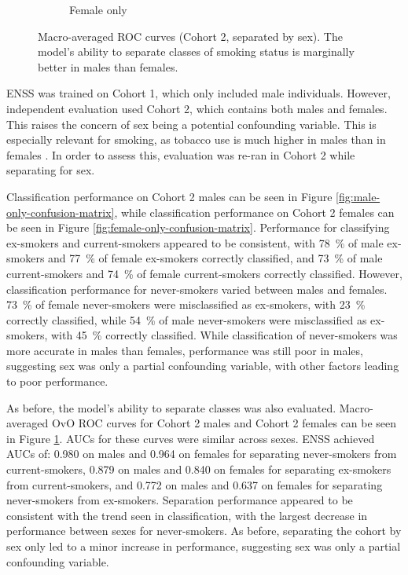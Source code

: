 \documentclass{article} %
\begin{document}
\begin{figure}[!p]
\begin{subfigure}{0.42\linewidth}
        \caption{Female only}
    \end{subfigure}
    \caption[Macro-averaged ROC curves (Cohort 2, separated by sex)]{Macro-averaged ROC curves (Cohort 2, separated by sex). The model's ability to separate classes of smoking status is marginally better in males than females.}
    \label{fig:sex-sep-macro-rocs}
\end{figure}

ENSS was trained on Cohort 1, which only included male individuals. However, independent evaluation used Cohort 2, which contains both males and females. This raises the concern of sex being a potential confounding variable. This is especially relevant for smoking, as tobacco use is much higher in males than in females \cite{WHO2021Tobacco, higgins2015literature}. In order to assess this, evaluation was re-ran in Cohort 2 while separating for sex.

Classification performance on Cohort 2 males can be seen in Figure \ref{fig:male-only-confusion-matrix}, while classification performance on Cohort 2 females can be seen in Figure \ref{fig:female-only-confusion-matrix}. Performance for classifying ex-smokers and current-smokers appeared to be consistent, with \SI{78}{\percent} of male ex-smokers and \SI{77}{\percent} of female ex-smokers correctly classified, and \SI{73}{\percent} of male current-smokers and \SI{74}{\percent} of female current-smokers correctly classified. However, classification performance for never-smokers varied between males and females. \SI{73}{\percent} of female never-smokers were misclassified as ex-smokers, with \SI{23}{\percent} correctly classified, while \SI{54}{\percent} of male never-smokers were misclassified as ex-smokers, with \SI{45}{\percent} correctly classified. While classification of never-smokers was more accurate in males than females, performance was still poor in males, suggesting sex was only a partial confounding variable, with other factors leading to poor performance.

As before, the model's ability to separate classes was also evaluated. Macro-averaged OvO ROC curves for Cohort 2 males and Cohort 2 females can be seen in Figure \ref{fig:sex-sep-macro-rocs}. AUCs for these curves were similar across sexes.
ENSS achieved AUCs of: 0.980 on males and 0.964 on females for separating never-smokers from current-smokers, 0.879 on males and 0.840 on females for separating ex-smokers from current-smokers, and 0.772 on males and 0.637 on females for separating never-smokers from ex-smokers. Separation performance appeared to be consistent with the trend seen in classification, with the largest decrease in performance between sexes for never-smokers. As before, separating the cohort by sex only led to a minor increase in performance, suggesting sex was only a partial confounding variable.
\end{document}
